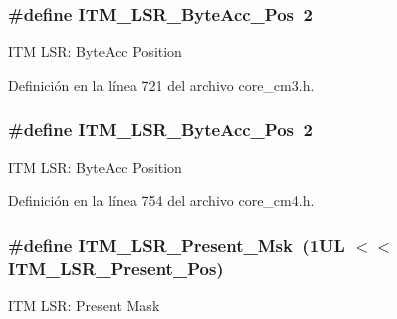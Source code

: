 \subsubsection[{\texorpdfstring{I\+T\+M\+\_\+\+L\+S\+R\+\_\+\+Byte\+Acc\+\_\+\+Pos}{ITM_LSR_ByteAcc_Pos}}]{\setlength{\rightskip}{0pt plus 5cm}\#define I\+T\+M\+\_\+\+L\+S\+R\+\_\+\+Byte\+Acc\+\_\+\+Pos~2}\hypertarget{group___c_m_s_i_s___i_t_m_gabfae3e570edc8759597311ed6dfb478e}{}\label{group___c_m_s_i_s___i_t_m_gabfae3e570edc8759597311ed6dfb478e}
I\+TM L\+SR\+: Byte\+Acc Position 

Definición en la línea 721 del archivo core\+\_\+cm3.\+h.

\subsubsection[{\texorpdfstring{I\+T\+M\+\_\+\+L\+S\+R\+\_\+\+Byte\+Acc\+\_\+\+Pos}{ITM_LSR_ByteAcc_Pos}}]{\setlength{\rightskip}{0pt plus 5cm}\#define I\+T\+M\+\_\+\+L\+S\+R\+\_\+\+Byte\+Acc\+\_\+\+Pos~2}\hypertarget{group___c_m_s_i_s___i_t_m_gabfae3e570edc8759597311ed6dfb478e}{}\label{group___c_m_s_i_s___i_t_m_gabfae3e570edc8759597311ed6dfb478e}
I\+TM L\+SR\+: Byte\+Acc Position 

Definición en la línea 754 del archivo core\+\_\+cm4.\+h.

\subsubsection[{\texorpdfstring{I\+T\+M\+\_\+\+L\+S\+R\+\_\+\+Present\+\_\+\+Msk}{ITM_LSR_Present_Msk}}]{\setlength{\rightskip}{0pt plus 5cm}\#define I\+T\+M\+\_\+\+L\+S\+R\+\_\+\+Present\+\_\+\+Msk~(1\+U\+L $<$$<$ I\+T\+M\+\_\+\+L\+S\+R\+\_\+\+Present\+\_\+\+Pos)}\hypertarget{group___c_m_s_i_s___i_t_m_gaa5bc2a7f5f1d69ff819531f5508bb017}{}\label{group___c_m_s_i_s___i_t_m_gaa5bc2a7f5f1d69ff819531f5508bb017}
I\+TM L\+SR\+: Present Mask 

